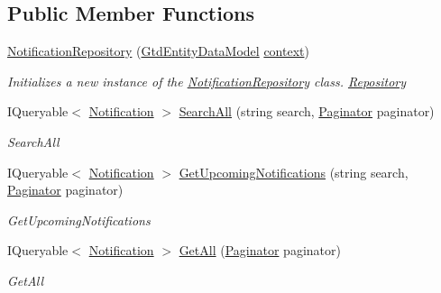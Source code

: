 \subsection*{Public Member Functions}
\begin{DoxyCompactItemize}
\item 
\mbox{\hyperlink{class_gtd_app_1_1_repository_1_1_notification_repository_a39cd06a390d0be8e1624dd4335e675ba}{Notification\+Repository}} (\mbox{\hyperlink{class_gtd_app_1_1_data_1_1_gtd_entity_data_model}{Gtd\+Entity\+Data\+Model}} \mbox{\hyperlink{class_gtd_app_1_1_repository_1_1_repository_a693057a1b8acd4c3778c183440feed41}{context}})
\begin{DoxyCompactList}\small\item\em Initializes a new instance of the \mbox{\hyperlink{class_gtd_app_1_1_repository_1_1_notification_repository}{Notification\+Repository}} class. \mbox{\hyperlink{class_gtd_app_1_1_repository_1_1_repository}{Repository}} \end{DoxyCompactList}\item 
I\+Queryable$<$ \mbox{\hyperlink{class_gtd_app_1_1_data_1_1_notification}{Notification}} $>$ \mbox{\hyperlink{class_gtd_app_1_1_repository_1_1_notification_repository_ae7d00a78be601d51ade9419123960ec7}{Search\+All}} (string search, \mbox{\hyperlink{class_gtd_app_1_1_repository_1_1_paginator}{Paginator}} paginator)
\begin{DoxyCompactList}\small\item\em Search\+All \end{DoxyCompactList}\item 
I\+Queryable$<$ \mbox{\hyperlink{class_gtd_app_1_1_data_1_1_notification}{Notification}} $>$ \mbox{\hyperlink{class_gtd_app_1_1_repository_1_1_notification_repository_a58da3bf4239487b5553b8de26c70ca3d}{Get\+Upcoming\+Notifications}} (string search, \mbox{\hyperlink{class_gtd_app_1_1_repository_1_1_paginator}{Paginator}} paginator)
\begin{DoxyCompactList}\small\item\em Get\+Upcoming\+Notifications \end{DoxyCompactList}\item 
I\+Queryable$<$ \mbox{\hyperlink{class_gtd_app_1_1_data_1_1_notification}{Notification}} $>$ \mbox{\hyperlink{class_gtd_app_1_1_repository_1_1_notification_repository_a5bc417471e17a2b2730f92fdf207426c}{Get\+All}} (\mbox{\hyperlink{class_gtd_app_1_1_repository_1_1_paginator}{Paginator}} paginator)
\begin{DoxyCompactList}\small\item\em Get\+All \end{DoxyCompactList}\end{DoxyCompactItemize}
